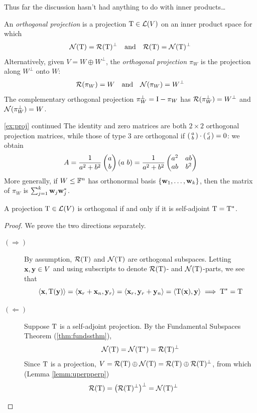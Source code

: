 	

Thus far the discussion hasn't had anything to do with inner products\ldots

\begin{defn}{}{}
	An \emph{orthogonal projection} is a projection $\mathrm{T}\in\mathcal{L}(V)$ on an inner product space for which
	\[
		\mathcal{N}(\mathrm{T})=\mathcal{R}(\mathrm{T})^\perp
		\quad\text{and}\quad 
		\mathcal{R}(\mathrm{T})=\mathcal{N}(\mathrm{T})^\perp
	\]
	Alternatively, given $V=W\oplus W^\perp$, the \emph{orthogonal projection $\pi_W$} is the projection along $W^\perp$ onto $W$:
	\[
		\mathcal{R}(\pi_W)=W
		\quad\text{and}\quad 
		\mathcal{N}(\pi_W)=W^\perp
	\]
	The complementary orthogonal projection $\pi_W^\perp=\mathrm{I}-\pi_W$ has $\mathcal{R}(\pi_W^\perp)=W^\perp$ and $\mathcal{N}(\pi_W^\perp)=W$.
\end{defn}


\begin{example*}{\ref{ex:proj} continued}{}
	The identity and zero matrices are both $2\times 2$ orthogonal projection matrices, while those of type 3 are orthogonal if $\left(\begin{smallmatrix}a\\b\end{smallmatrix}\right)\cdot\left(\begin{smallmatrix}c\\d\end{smallmatrix}\right)=0$: we obtain
	\[
		A=\frac 1{a^2+b^2}\begin{pmatrix}a\\b\end{pmatrix}(a\ b)
		=\frac 1{a^2+b^2}
		\begin{pmatrix}
			a^2&ab\\
			ab&b^2
		\end{pmatrix}
	\]
	More generally, if $W\le\mathbb{F}^n$ has orthonormal basis $\{{\mathbf{{\mathbf{w}}}}_1,\ldots,{\mathbf{{\mathbf{w}}}}_{k}\}$, then the matrix of $\pi_W$ is $\sum_{j=1}^k{\mathbf{w}}_j{\mathbf{w}}_j^*$.
\end{example*}


\pagebreak[3]


\begin{thm}{}{}
	A projection $\mathrm{T}\in\mathcal{L}(V)$ is orthogonal if and only if it is self-adjoint $\mathrm{T}=\mathrm{T}^*$. 
\end{thm}
  

\begin{proof}
	We prove the two directions separately.
	\begin{description}
		\item[$(\Rightarrow)$] By assumption, $\mathcal{R}(\mathrm{T})$ and $\mathcal{N}(\mathrm{T})$ are orthogonal subspaces. Letting ${\mathbf{x}},{\mathbf{y}}\in V$ and using subscripts to denote $\mathcal{R}(\mathrm{T})$- and $\mathcal{N}(\mathrm{T})$-parts, we see that
		\[
			\left\langle {\mathbf{x}},\mathrm{T}({\mathbf{y}})\right\rangle=\left\langle {\mathbf{x}}_r+{\mathbf{x}}_n,{\mathbf{y}}_r\right\rangle
			=\left\langle {\mathbf{x}}_r,{\mathbf{y}}_r+{\mathbf{y}}_n\right\rangle=\left\langle \mathrm{T}({\mathbf{x}}),{\mathbf{y}}\right\rangle 
			\implies \mathrm{T}^*=\mathrm{T}
		\]
		\item[$(\Leftarrow)$] Suppose $\mathrm{T}$ is a self-adjoint projection. By the Fundamental Subspaces Theorem (\ref{thm:fundssthm}),
		\[
			\mathcal{N}(\mathrm{T})=\mathcal{N}(\mathrm{T}^*)=\mathcal{R}(\mathrm{T})^\perp
		\]
		Since $\mathrm{T}$ is a projection, $V=\mathcal{R}(\mathrm{T})\oplus\mathcal{N}(\mathrm{T})= \mathcal{R}(\mathrm{T})\oplus \mathcal{R}(\mathrm{T})^\perp$, from which (Lemma \ref{lemm:uperpperp})
		\[
			\mathcal{R}(\mathrm{T})=\bigl(\mathcal{R}(\mathrm{T})^\perp\bigr)^\perp=\mathcal{N}(\mathrm{T})^\perp\tag*{\qedhere}
		\]\vspace{-10pt}
	\end{description}
\end{proof}
 


